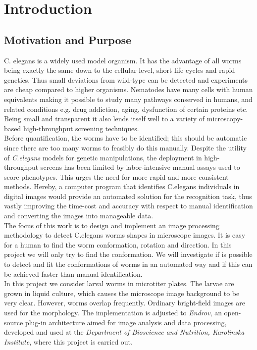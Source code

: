 \thispagestyle{empty}
\chapter{Introduction}

\section{Motivation and Purpose}
\label{sec:motivation}

C. elegans is a widely used model organism. It has the advantage of all worms 
being exactly the same down to the cellular level, short life cycles and rapid
 genetics. Thus small deviations from wild-type can be detected and experiments
 are cheap compared to higher organisms. Nematodes have many cells with human
 equivalents making it possible to study many pathways conserved in humans, 
and related conditions e.g. drug addiction, aging, dysfunction of certain
 proteins etc. Being small and transparent it also lends itself well to a 
variety of microscopy-based high-throughput screening techniques.\\
 
Before quantification, the worms have to be identified; this should be 
automatic since there are too many worms to feasibly do this manually.
Despite the utility of \emph{C.elegans} models for genetic 
manipulations, the deployment in high-throughput screens has been limited by 
labor-intensive manual assays used to score phenotypes. This urges the need for more rapid and more 
consistent methods.
Hereby, a computer
program that identifies C.elegans individuals in digital images would 
provide an automated solution for the recognition task, thus vastly 
improving the time-cost and accuracy with respect to manual identification 
and converting the images into manageable data.\\

The focus of this work is to design and implement an image processing
methodology to detect C.elegans worms shapes in microscope images.
It is easy for a human to find the worm conformation, rotation and direction. In this project we will only 
try to find the conformation. We will investigate if is possible to detect and fit the conformations of worms 
in an automated way and if this can be achieved faster than manual identification.\\

In this project we consider larval worms in microtiter plates. The larvae are 
grown in liquid culture, which causes the microscope image background to be 
very clear. However, worms overlap frequently. Ordinary bright-field images are 
used for the morphology. The implementation is adjusted to \emph{Endrov},
an open-source plug-in architecture aimed for image analysis and data processing, developed and used at the 
\emph{Department of Bioscience and Nutrition, Karolinska Institute},
where this project is carried out.

